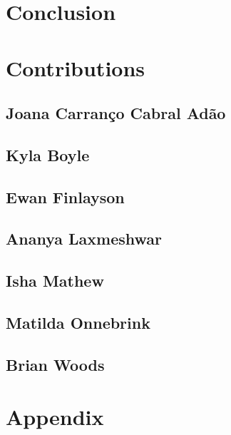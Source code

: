 \documentclass[12pt]{article}
\begin{document}
\newpage

\section{Conclusion}

\newpage



 \label{sec:ref}

\vspace{1.5cm}

\section*{Contributions}

\subsection*{Joana Carranço Cabral Adão}


\subsection*{Kyla Boyle}


\subsection*{Ewan Finlayson}


\subsection*{Ananya Laxmeshwar}


\subsection*{Isha Mathew}


\subsection*{Matilda Onnebrink}


\subsection*{Brian Woods}


\listoffigures

\listoftables

\section*{Appendix}
\end{document}
